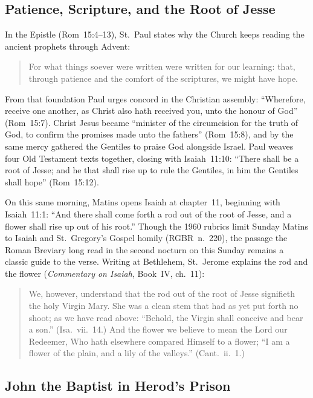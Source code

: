 \subsection{Patience, Scripture, and the Root of Jesse}

In the Epistle (Rom~15:4--13), St.~Paul states why the Church keeps
reading the ancient prophets through Advent:

\begin{quote}
For what things soever were written were written for our learning:
that, through patience and the comfort of the scriptures, we might have
hope.
\end{quote}

From that foundation Paul urges concord in the Christian assembly:
``Wherefore, receive one another, as Christ also hath received you, unto
the honour of God'' (Rom~15:7). Christ Jesus became ``minister of the
circumcision for the truth of God, to confirm the promises made unto the
fathers'' (Rom~15:8), and by the same mercy gathered the Gentiles to
praise God alongside Israel. Paul weaves four Old Testament texts
together, closing with Isaiah~11:10: ``There shall be a root of Jesse;
and he that shall rise up to rule the Gentiles, in him the Gentiles
shall hope'' (Rom~15:12).

On this same morning, Matins opens Isaiah at chapter~11, beginning with
Isaiah~11:1: ``And there shall come forth a rod out of the root of
Jesse, and a flower shall rise up out of his root.'' Though the 1960
rubrics limit Sunday Matins to Isaiah and St.~Gregory's Gospel homily
(RGBR~n.~220), the passage the Roman Breviary long read in the second
nocturn on this Sunday remains a classic guide to the verse. Writing at
Bethlehem, St.~Jerome explains the rod and the flower
(\textit{Commentary on Isaiah}, Book~IV, ch.~11):

\begin{quote}
We, however, understand that the rod out of the root of Jesse
signifieth the holy Virgin Mary. She was a clean stem that had as yet
put forth no shoot; as we have read above: ``Behold, the Virgin shall
conceive and bear a son.'' (Isa.\ vii.\ 14.) And the flower we believe to
mean the Lord our Redeemer, Who hath elsewhere compared Himself to a
flower; ``I am a flower of the plain, and a lily of the valleys.''
(Cant.\ ii.\ 1.)
\end{quote}

\subsection{John the Baptist in Herod's Prison}

